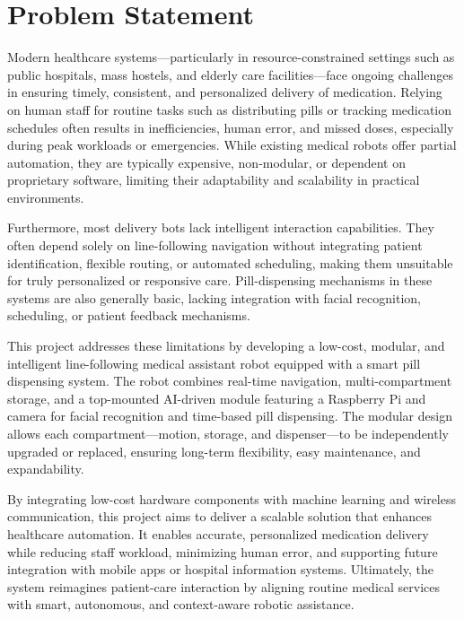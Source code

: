 \vspace{1.5\baselineskip} 

\section{Problem Statement}
Modern healthcare systems—particularly in resource-constrained settings such as public hospitals, mass hostels, and elderly care facilities—face ongoing challenges in ensuring timely, consistent, and personalized delivery of medication. Relying on human staff for routine tasks such as distributing pills or tracking medication schedules often results in inefficiencies, human error, and missed doses, especially during peak workloads or emergencies. While existing medical robots offer partial automation, they are typically expensive, non-modular, or dependent on proprietary software, limiting their adaptability and scalability in practical environments.

Furthermore, most delivery bots lack intelligent interaction capabilities. They often depend solely on line-following navigation without integrating patient identification, flexible routing, or automated scheduling, making them unsuitable for truly personalized or responsive care. Pill-dispensing mechanisms in these systems are also generally basic, lacking integration with facial recognition, scheduling, or patient feedback mechanisms.

This project addresses these limitations by developing a low-cost, modular, and intelligent line-following medical assistant robot equipped with a smart pill dispensing system. The robot combines real-time navigation, multi-compartment storage, and a top-mounted AI-driven module featuring a Raspberry Pi and camera for facial recognition and time-based pill dispensing. The modular design allows each compartment—motion, storage, and dispenser—to be independently upgraded or replaced, ensuring long-term flexibility, easy maintenance, and expandability.

By integrating low-cost hardware components with machine learning and wireless communication, this project aims to deliver a scalable solution that enhances healthcare automation. It enables accurate, personalized medication delivery while reducing staff workload, minimizing human error, and supporting future integration with mobile apps or hospital information systems. Ultimately, the system reimagines patient-care interaction by aligning routine medical services with smart, autonomous, and context-aware robotic assistance. 

